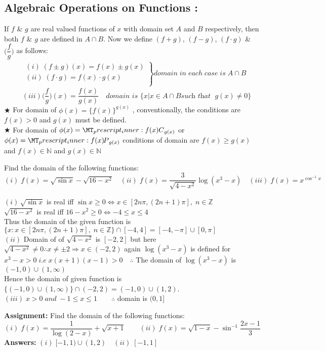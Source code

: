 \documentclass[a4paper,10.5pt,fleqn]{article}
\newcommand\perm[2][^n]{\prescript{#1\mkern-2.5mu}{}P_{#2}}
\newcommand\comb[2][^n]{\prescript{#1\mkern-0.5mu}{}C_{#2}}
\begin{document}
\subsection{Algebraic Operations on Functions :}
If $f$ \& $g$ are real valued functions of $x$ with domain set $A$ and $B$ respectively, then both $f$ \& $g$ are defined in $A \cap B$.
Now we define $(f + g)$, $(f-g)$, $(f\cdot g)$ \& $\Bigg(\dfrac{f}{g}\Bigg)$ as follows:
\begin{align*}
   \left.\begin{array}{rl}
        & (i)\; (f\pm g)(x) = f(x)\pm g(x)\\
        & (ii)\; (f\cdot g) = f(x)\cdot g(x)\\
           \end{array}
        \right\} domain\;in\;each\;case\;is\;A\cap B 
\end{align*}
\[\quad\;\,(iii)\Bigg(\dfrac{f}{g}\Bigg)(x)= \dfrac{f(x)}{g(x)}\quad \textit{domain is }\{x|x\in A\cap B \textit{such that }\; g(x)\neq 0 \} \]
$\bigstar$ For domain of $\phi(x) = \{f(x)\}^{g(x)}$ , conventionally, the conditions are $f(x) > 0$ and $g(x)$ must be defined.\\
$\bigstar$ For domain of $\phi(x) = \comb[f(x)]{g(x)}$ or $\phi(x) =\perm[f(x)]{g(x)}$ conditions of domain are $f(x)\ge g(x)$ and $f(x)\in \mathbb{N}$ and $g(x) \in \mathbb{N}$ 
\begin{example}
Find the domain of the following functions: \\
$(i)\;f(x)=\sqrt{\sin x}-\sqrt{16-x^2}\quad (ii)\;f(x)=\dfrac{3}{\sqrt{4-x^2}}\log(x^{3}-x)\quad (iii)\;f(x)=x^{\cos^{-1}x}$
\end{example}
\begin{soln}
$(i)\,\sqrt{\sin x}$ is real iff $\sin x \ge 0\Longleftrightarrow x\in [2n\pi, (2n +1)\pi],\;n\in \mathbb{Z}$\\$\sqrt{16-x^2}$ is real iff  $16-x^2 \ge 0 \Longleftrightarrow -4\le x\le 4$\\
Thus the domain of the given function is $ \{x : x\in[2n\pi, (2n+1)\pi],\; n\in\mathbb{Z}\}\cap[-4, 4] = [-4,-\pi] \cup [0, \pi]$\\
$(ii)$ Domain of of $\sqrt{4-x^2}$ is $[-2,2]$ but here $\sqrt{4-x^2} \neq 0 \therefore x\neq \pm 2 \Rightarrow x\in (-2,2)$ again $\log(x^3 -x)$ is defined for $x^3 -x >0\; i.e\; x(x+1)(x-1)>0 \quad \therefore$  The domain of  $\log(x^3 -x)$ is $(-1,0)\cup (1,\infty)$\\
Hence the domain of given function is $\{ (-1,0)\cup (1,\infty)\}\cap (-2,2) = (-1,0)\cup (1,2)$.\\
$(iii)\; x>0\; and\;  -1\le x\le 1\qquad \therefore$ domain is $(0,1]$ 
\end{soln}
\textbf{Assignment:} Find the domain of the following functions:\\
$(i)\; f(x)=\dfrac{1}{\log(2-x)} +\sqrt{x+1}\qquad (ii)\; f(x) = \sqrt{1-x}-\sin^{-1}\dfrac{2x-1}{3}$\\
\textbf{Answers:} $(i)\; [-1,1)\cup (1,2)\quad (ii)\; [-1,1] $
\end{document}
